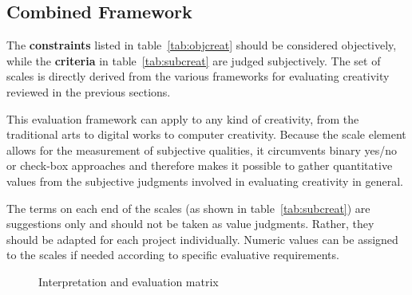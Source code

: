 \subsection{Combined Framework}
\label{s:framework}

The \textbf{constraints} listed in table~\ref{tab:objcreat} should be considered objectively, while the \textbf{criteria} in table~\ref{tab:subcreat} are judged subjectively. The set of scales is directly derived from the various frameworks for evaluating creativity reviewed in the previous sections.

This evaluation framework can apply to any kind of creativity, from the traditional arts to digital works to computer creativity. Because the scale element allows for the measurement of subjective qualities, it circumvents binary yes/no or check-box approaches and therefore makes it possible to gather quantitative values from the subjective judgments involved in evaluating creativity in general.

The terms on each end of the scales (as shown in table~\ref{tab:subcreat}) are suggestions only and should not be taken as value judgments. Rather, they should be adapted for each project individually. Numeric values can be assigned to the scales if needed according to specific evaluative requirements.


\begin{figure}[!htbp] %
  \centering
\caption[Interpretation and evaluation matrix]{Interpretation and evaluation matrix}
\label{fig:matrix}
\end{figure}

